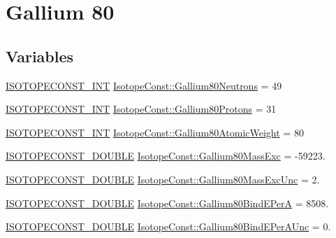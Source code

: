 \hypertarget{group___isotope_const-_gallium-_ga80}{}\section{Gallium 80}
\label{group___isotope_const-_gallium-_ga80}
\subsection*{Variables}
\begin{DoxyCompactItemize}
\item 
\mbox{\hyperlink{group___isotope_const-_macros_ga5f18360b3e99483a35c32d789e62621c}{I\+S\+O\+T\+O\+P\+E\+C\+O\+N\+S\+T\+\_\+\+I\+NT}} \mbox{\hyperlink{group___isotope_const-_gallium-_ga80_ga64612795577ea2d031b7b77fd7d25abe}{Isotope\+Const\+::\+Gallium80\+Neutrons}} = 49
\item 
\mbox{\hyperlink{group___isotope_const-_macros_ga5f18360b3e99483a35c32d789e62621c}{I\+S\+O\+T\+O\+P\+E\+C\+O\+N\+S\+T\+\_\+\+I\+NT}} \mbox{\hyperlink{group___isotope_const-_gallium-_ga80_gabface17e77a7c280082dc8d4bc38756f}{Isotope\+Const\+::\+Gallium80\+Protons}} = 31
\item 
\mbox{\hyperlink{group___isotope_const-_macros_ga5f18360b3e99483a35c32d789e62621c}{I\+S\+O\+T\+O\+P\+E\+C\+O\+N\+S\+T\+\_\+\+I\+NT}} \mbox{\hyperlink{group___isotope_const-_gallium-_ga80_ga75ded49aa4db2d22ec04b3d826c6b0c2}{Isotope\+Const\+::\+Gallium80\+Atomic\+Weight}} = 80
\item 
\mbox{\hyperlink{group___isotope_const-_macros_ga8f45a7272ce02c0b4c65c44636ed719a}{I\+S\+O\+T\+O\+P\+E\+C\+O\+N\+S\+T\+\_\+\+D\+O\+U\+B\+LE}} \mbox{\hyperlink{group___isotope_const-_gallium-_ga80_gae0ccc1049def49696db553f7ab048af9}{Isotope\+Const\+::\+Gallium80\+Mass\+Exc}} = -\/59223.
\item 
\mbox{\hyperlink{group___isotope_const-_macros_ga8f45a7272ce02c0b4c65c44636ed719a}{I\+S\+O\+T\+O\+P\+E\+C\+O\+N\+S\+T\+\_\+\+D\+O\+U\+B\+LE}} \mbox{\hyperlink{group___isotope_const-_gallium-_ga80_ga5eb8fa0bdd2ab07796ac925915ef3790}{Isotope\+Const\+::\+Gallium80\+Mass\+Exc\+Unc}} = 2.
\item 
\mbox{\hyperlink{group___isotope_const-_macros_ga8f45a7272ce02c0b4c65c44636ed719a}{I\+S\+O\+T\+O\+P\+E\+C\+O\+N\+S\+T\+\_\+\+D\+O\+U\+B\+LE}} \mbox{\hyperlink{group___isotope_const-_gallium-_ga80_gac61e450441c509023f8d37e4d044206b}{Isotope\+Const\+::\+Gallium80\+Bind\+E\+PerA}} = 8508.
\item 
\mbox{\hyperlink{group___isotope_const-_macros_ga8f45a7272ce02c0b4c65c44636ed719a}{I\+S\+O\+T\+O\+P\+E\+C\+O\+N\+S\+T\+\_\+\+D\+O\+U\+B\+LE}} \mbox{\hyperlink{group___isotope_const-_gallium-_ga80_gae95270979180a9c2f97cc7c3f4a8a9fa}{Isotope\+Const\+::\+Gallium80\+Bind\+E\+Per\+A\+Unc}} = 0.

\end{DoxyCompactItemize}

